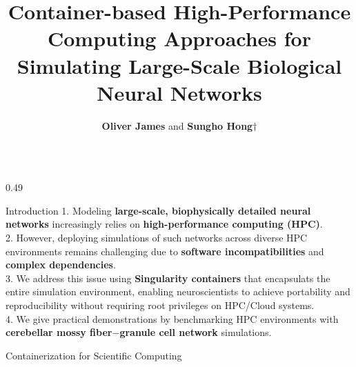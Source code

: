 \documentclass{beamer}
\begin{document}

\title[]{\Huge Container-based High-Performance Computing Approaches for Simulating Large-Scale Biological Neural Networks  \\[-0.1 in]}
\author[]{\LARGE \textbf{Oliver James} and \textbf{Sungho Hong$\dagger$ } \\[-0.1 in] }
\date{}



\begin{frame}
\vspace{-0.4 in}
\maketitle

 \begin{columns}
        \begin{column}{0.49\linewidth}
        \vspace{-0.3 in}
            \begin{block}{\LARGE Introduction}
            \justifying
        {\large 1. Modeling \textbf{large-scale, biophysically detailed neural networks} increasingly relies on \textbf{high-performance computing (HPC)}. \\[0.5 cm]

        2. However, deploying simulations of such networks across diverse HPC environments remains challenging due to \textbf{software incompatibilities} and \textbf{complex dependencies}. \\[0.5 cm]

3. We address this issue using \textbf{Singularity containers} that encapsulats the entire simulation environment, enabling neuroscientists to achieve portability and reproducibility without requiring root privileges on HPC/Cloud systems.\\[0.5 cm]

4. We give practical demonstrations by benchmarking HPC environments with \textbf{cerebellar mossy fiber$-$granule cell network} simulations.
               }
            \end{block}
            \vspace{0.5cm}
            \begin{block}{\LARGE Containerization for Scientific Computing}
            \centering
            \vspace{0.5cm}


\end{block}
\end{column}
\end{columns}
\end{frame}
\end{document}
